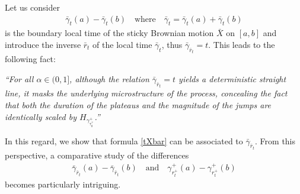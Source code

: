 \documentclass[10pt,a4paper]{article}
\numberwithin{equation}{section}
\theoremstyle{plain}
\newtheorem{theorem}{Theorem}
\theoremstyle{remark}
\begin{document}
Let us consider
\begin{align*}
\bar{\gamma}_t(a) - \bar{\gamma}_t(b) \quad \textrm{where} \quad \bar{\gamma}_t = \bar{\gamma}_t(a) + \bar{\gamma}_t(b)
\end{align*}
is the boundary local time of the sticky Brownian motion $\bar{X}$ on $[a,b]$ and introduce the inverse $\bar{r}_t$ of the local time $\bar{\gamma}_t$, thus $\bar{\gamma}_{\bar{r}_t} = t$. This leads to the following fact:
\begin{center}
\begin{minipage}{0.8\textwidth}
    \itshape %
    ``For all $\alpha\in (0,1]$, although the relation $\bar{\gamma}_{\bar{r}_t} = t$ yields a deterministic straight line, it masks the underlying microstructure of the process, concealing the fact that both the duration of the plateaus and the magnitude of the jumps are identically scaled by $H_{\gamma^+_{\tau^+_0}}$.''
\end{minipage}
\end{center}
In this regard, we show that formula \eqref{tXbar} can be associated to $\bar{\gamma}_{\bar{r}_t}$. From this perspective, a comparative study of the differences
\begin{align*}
\bar{\gamma}_{\bar{r}_t}(a) - \bar{\gamma}_{\bar{r}_t}(b) \quad \text{and} \quad \gamma^+_{r^+_t}(a) - \gamma^+_{r^+_t}(b)
\end{align*}
becomes particularly intriguing. 

%
\end{document}
